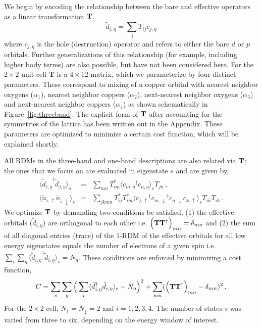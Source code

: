 We begin by encoding the relationship between the bare and effective operators as a linear transformation ${\bf T}$, 
\begin{equation}
	\tilde{d}_{i,\eta} = \sum_{j} T_{ij} c_{j,\eta}
\label{eq:dc}
\end{equation}
where $c_{j,\eta}$ is the hole (destruction) operator and refers to either the bare $d$ or $p$ orbitals. 
Further generalizations of this relationship (for example, including higher body terms) are also possible, but have not been considered here. 
For the $2\times2$ unit cell {\bf T} is a $4 \times 12 $ matrix, which we parameterize by 
four distinct parameters. These correspond to mixing of a copper orbital 
with nearest neighbor oxygens ($\alpha_1$), nearest neighbor coppers ($\alpha_2$), next-nearest neighbor oxygens ($\alpha_3$) 
and next-nearest neighbor coppers ($\alpha_4$) as shown schematically in Figure~\ref{fig:threeband}. 
The explicit form of ${\bf T}$ after accounting for the symmetries of the 
lattice has been written out in the Appendix. These parameters are optimized to minimize a certain cost function, 
which will be explained shortly. 

All RDMs in the three-band and one-band descriptions are also related via ${\bf T}$; 
the ones that we focus on are evaluated in eigenstate $s$ and are given by,
\begin{subequations}
\begin{eqnarray}
	\langle {\tilde{d}_{i,\eta}}^{\dagger} \tilde{d}_{j,\eta} \rangle_{s} &=& \sum_{mn} T^{*}_{im} \langle {c_{m,\eta}}^{\dagger} c_{n,\eta} \rangle_{s} T_{jn} \label{eq:dmstransformations1} \,,\\
	\langle \tilde{n}_{i,\uparrow} \tilde{n}_{i,\downarrow} \rangle_{s} &=& \sum_{jkmn} T^{*}_{ij} T^{*}_{im} \langle {c_{j,\uparrow}}^{\dagger} {c_{m,\downarrow}}^{\dagger} c_{n,\downarrow} c_{k,\uparrow} \rangle_{s} T_{in} T_{ik}\,.
\label{eq:dmstransformations2}
\end{eqnarray}
\end{subequations}
We optimize ${\bf T}$ by demanding two conditions be satisfied, (1) the effective orbitals ($\tilde{d}_{i,\eta}$) 
are orthogonal to each other i.e. $\Big({\bf T} {\bf T}^{\dagger}\Big)_{mn} = \delta_{mn}$
and (2) the sum of all diagonal entries (trace) of the 1-RDM of the effective orbitals for all low energy eigenstates 
equals the number of electrons of a given spin i.e. $\sum_{i} \sum_{\eta} \langle {\tilde{d}_{i,\eta}}^{\dagger} \tilde{d}_{i,\eta} \rangle_{s} = N_{\eta}$. 
These conditions are enforced by minimizing a cost function,
\begin{equation}
C = \sum_{s} \sum_{\eta} \Big( \sum_{i} \langle \tilde{d}_{i,\eta}^{\dagger} \tilde{d}_{i,\eta} \rangle_{s} - N_{\eta} \Big)^{2} + \sum_{mn} ( \Big({\bf T} {\bf T}^{\dagger}\Big)_{mn} -\delta_{mn})^{2}\,.
\label{eq:C}
\end{equation} 
For the $2\times2$ cell, $N_{\uparrow}=N_{\downarrow}=2$ and $i=1,2,3,4$. 
The number of states $s$ was varied from three to six, depending on the energy window of interest.  

